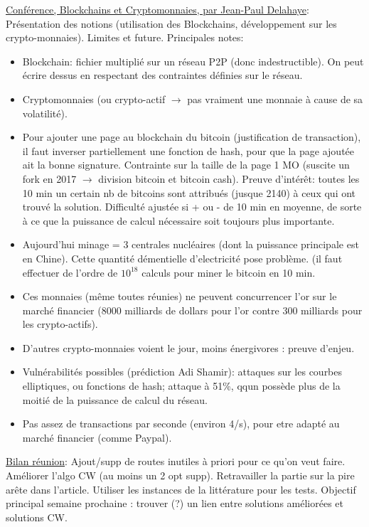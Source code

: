 \documentclass[a4paper,11pt]{article}%
\begin{document}
\underline{Conférence, Blockchains et Cryptomonnaies, par Jean-Paul Delahaye}: Présentation des notions (utilisation des Blockchains, développement sur les crypto-monnaies). Limites et future.
Principales notes:
\begin{itemize}
\item Blockchain: fichier multiplié sur un réseau P2P (donc indestructible). On peut écrire dessus en respectant des contraintes définies sur le réseau.
\item Cryptomonnaies (ou crypto-actif $\rightarrow$ pas vraiment une monnaie à cause de sa volatilité).
\item Pour ajouter une page au blockchain du bitcoin (justification de transaction), il faut inverser partiellement une fonction de hash, pour que la page ajoutée ait la bonne signature. Contrainte sur la taille de la page 1 MO (suscite un fork en 2017 $\rightarrow$ division bitcoin et bitcoin cash). Preuve d'intérêt: toutes les 10 min un certain nb de bitcoins sont attribués (jusque 2140) à ceux qui ont trouvé la solution. Difficulté ajustée si + ou - de 10 min en moyenne, de sorte à ce que la puissance de calcul nécessaire soit toujours plus importante. 
\item Aujourd'hui minage = 3 centrales nucléaires (dont la puissance principale est en Chine). Cette quantité démentielle d'electricité pose problème. (il faut effectuer de l'ordre de $10^{18}$ calculs pour miner le bitcoin en 10 min.

\item Ces monnaies (même toutes réunies) ne peuvent concurrencer l'or sur le marché financier (8000 milliards de dollars pour l'or contre 300 milliards pour les crypto-actifs).

\item D'autres crypto-monnaies voient le jour, moins énergivores : preuve d'enjeu.

\item Vulnérabilités possibles (prédiction Adi Shamir): attaques sur les courbes elliptiques, ou fonctions de hash; attaque à 51\%, qqun possède plus de la moitié de la puissance de calcul du réseau. 

\item Pas assez de transactions par seconde (environ 4/s), pour etre adapté au marché financier (comme Paypal). 
\end{itemize}

\underline{Bilan réunion}: Ajout/supp de routes inutiles à priori pour ce qu'on veut faire. Améliorer l'algo CW (au moins un 2 opt supp). Retravailler la partie sur la pire arête dans l'article. Utiliser les instances de la littérature pour les tests. Objectif principal semaine prochaine : trouver (?) un lien entre solutions améliorées et solutions CW.
\end{document}
